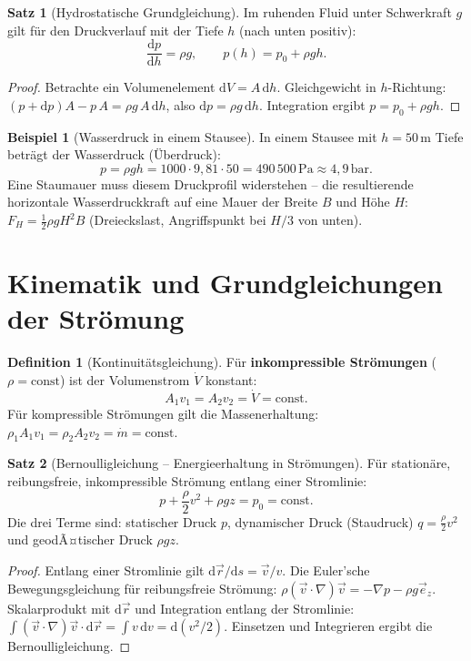 ﻿\documentclass[a4paper,12pt]{report}
\theoremstyle{definition}
\newtheorem{definition}{Definition}
\newtheorem{beispiel}{Beispiel}
\newtheorem{satz}{Satz}
\begin{document}
\begin{satz}[Hydrostatische Grundgleichung]
Im ruhenden Fluid unter Schwerkraft $g$ gilt f\"ur den Druckverlauf
mit der Tiefe $h$ (nach unten positiv):
\[
  \frac{\mathrm{d}p}{\mathrm{d}h} = \rho g, \qquad p(h) = p_0 + \rho g h.
\]
\end{satz}
\begin{proof}
Betrachte ein Volumenelement $\mathrm{d}V = A\,\mathrm{d}h$.
Gleichgewicht in $h$-Richtung: $(p + \mathrm{d}p)A - p\,A = \rho g\,A\,\mathrm{d}h$,
also $\mathrm{d}p = \rho g\,\mathrm{d}h$. Integration ergibt $p = p_0 + \rho g h$.
\end{proof}

\begin{beispiel}[Wasserdruck in einem Stausee]
In einem Stausee mit $h = 50\,\mathrm{m}$ Tiefe betr\"agt der Wasserdruck
(\"Uberdruck):
\[
  p = \rho g h = 1000\cdot9{,}81\cdot50 = 490\,500\,\mathrm{Pa} \approx 4{,}9\,\mathrm{bar}.
\]
Eine Staumauer muss diesem Druckprofil widerstehen -- die resultierende
horizontale Wasserdruckkraft auf eine Mauer der Breite $B$ und H\"ohe $H$:
$F_H = \tfrac{1}{2}\rho g H^2 B$ (Dreieckslast, Angriffspunkt bei $H/3$ von unten).
\end{beispiel}

\section{Kinematik und Grundgleichungen der Str\"omung}

\begin{definition}[Kontinuit\"atsgleichung]
F\"ur \textbf{inkompressible Str\"omungen} ($\rho = \mathrm{const}$)
ist der Volumenstrom $\dot{V}$ konstant:
\[
  A_1 v_1 = A_2 v_2 = \dot{V} = \mathrm{const}.
\]
F\"ur kompressible Str\"omungen gilt die Massenerhaltung:
$\rho_1 A_1 v_1 = \rho_2 A_2 v_2 = \dot{m} = \mathrm{const}$.
\end{definition}

\begin{satz}[Bernoulligleichung -- Energieerhaltung in Str\"omungen]
F\"ur station\"are, reibungsfreie, inkompressible Str\"omung
entlang einer Stromlinie:
\[
  p + \frac{\rho}{2}v^2 + \rho g z = p_0 = \mathrm{const}.
\]
Die drei Terme sind: statischer Druck $p$, dynamischer Druck (Staudruck)
$q = \frac{\rho}{2}v^2$ und geodÃ¤tischer Druck $\rho g z$.
\end{satz}
\begin{proof}
Entlang einer Stromlinie gilt $\mathrm{d}\vec{r}/\mathrm{d}s = \vec{v}/v$.
Die Euler'sche Bewegungsgleichung f\"ur reibungsfreie Str\"omung:
$\rho(\vec{v}\cdot\nabla)\vec{v} = -\nabla p - \rho g\vec{e}_z$.
Skalarprodukt mit $\mathrm{d}\vec{r}$ und Integration entlang der Stromlinie:
$\int(\vec{v}\cdot\nabla)\vec{v}\cdot\mathrm{d}\vec{r} = \int v\,\mathrm{d}v = \mathrm{d}(v^2/2)$.
Einsetzen und Integrieren ergibt die Bernoulligleichung.
\end{proof}
\end{document}
